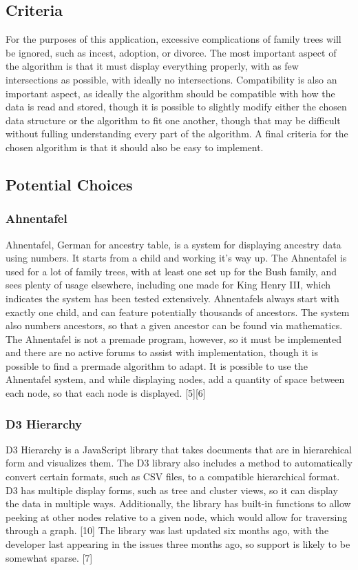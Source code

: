 \documentclass[onecolumn, draftclsnofoot,10pt, compsoc]{IEEEtran}
\begin{document}
\subsection{Criteria}
For the purposes of this application, excessive complications of family trees will be ignored, such as incest, adoption, or divorce. The most important aspect of the algorithm is that it must display everything properly, with as few intersections as possible, with ideally no intersections. Compatibility is also an important aspect, as ideally the algorithm should be compatible with how the data is read and stored, though it is possible to slightly modify either the chosen data structure or the algorithm to fit one another, though that may be difficult without fulling understanding every part of the algorithm. A final criteria for the chosen algorithm is that it should also be easy to implement.
\subsection{Potential Choices}
\subsubsection{Ahnentafel}
Ahnentafel, German for ancestry table, is a system for displaying ancestry data using numbers. It starts from a child and working it's way up. The Ahnentafel is used for a lot of family trees, with at least one set up for the Bush family, and sees plenty of usage elsewhere, including one made for King Henry III, which indicates the system has been tested extensively. Ahnentafels always start with exactly one child, and can feature potentially thousands of ancestors. The system also numbers ancestors, so that a given ancestor can be found via mathematics. The Ahnentafel is not a premade program, however, so it must be implemented and there are no active forums to assist with implementation, though it is possible to find a prermade algorithm to adapt. It is possible to use the Ahnentafel system, and while displaying nodes, add a quantity of space between each node, so that each node is displayed. [5][6]

\subsubsection{D3 Hierarchy}
D3 Hierarchy is a JavaScript library that takes documents that are in hierarchical form and visualizes them. The D3 library also includes a method to automatically convert certain formats, such as CSV files, to a compatible hierarchical format. D3 has multiple display forms, such as tree and cluster views, so it can display the data in multiple ways. Additionally, the library has built-in functions to allow peeking at other nodes relative to a given node, which would allow for traversing through a graph. [10] The library was last updated six months ago, with the developer last appearing in the issues three months ago, so support is likely to be somewhat sparse. [7]
\end{document}
